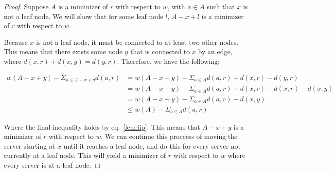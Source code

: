 \begin{proof}
    Suppose $A$ is a minimizer of $r$ with respect to $w$, with $x \in A$ such that $x$ is not a leaf node. We will show that for some leaf node $l$, $A-x+l$ is a minimizer of $r$ with respect to $w$. 

    Because $x$ is not a leaf node, it must be connected to at least two other nodes. This means that there exists some node $y$ that is connected to $x$ by an edge, where $d(x,r) + d(x,y) = d(y,r)$. Therefore, we have the following:

    \begin{equation*}
        \begin{split}
            w(A-x+y) - \Sigma_{a \in A-x+y} d(a,r) &= w(A-x+y) - \Sigma_{a \in A} d(a,r) + d(x,r) - d(y,r) \\
            &= w(A-x+y) - \Sigma_{a \in A} d(a,r) + d(x,r) - d(x,r) - d(x,y)\\
            &= w(A-x+y) - \Sigma_{a \in A} d(a,r) - d(x,y) \\
            &\leq w(A) - \Sigma_{a \in A} d(a,r)
        \end{split}
    \end{equation*}

    Where the final inequality holds by eq.~\ref{lem:lip}. This means that $A-x+y$ is a minimizer of $r$ with respect to $w$. We can continue this proccess of moving the server starting at $x$ until it reaches a leaf node, and do this for every server not currently at a leaf node. This will yield a minimizer of $r$ with respect to $w$ where every server is at a leaf node.
\end{proof}